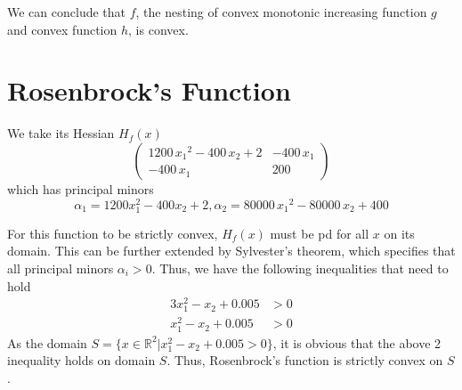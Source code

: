 We can conclude that $f$, the nesting of convex monotonic increasing function $g$ and convex function $h$, is convex.

\section{Rosenbrock's Function}
We take its Hessian $H_f(x)$
\[
\left(\begin{array}{cc}
1200\,{x_1 }^2 -400\,x_2 +2 & -400\,x_1 \\
-400\,x_1  & 200
\end{array}\right)
\]
which has principal minors
\[
\alpha_1 = 1200x_1^2-400x_2 + 2, \alpha_2 = 80000\,{x_1 }^2 -80000\,x_2 +400
\]

For this function to be strictly convex, $H_f(x)$ must be pd for all $x$ on its domain. This can be further extended by Sylvester's theorem, which specifies that all principal minors $\alpha_i > 0$. Thus, we have the following inequalities that need to hold
\begin{align*}
    3x_1^2-x_2+0.005 &> 0\\
    x_1^2 - x_2 + 0.005 &> 0
\end{align*}
As the domain $S = \{x \in \mathbb{R}^2 | x_1^2-x_2+0.005 > 0\}$, it is obvious that the above 2 inequality holds on domain $S$. Thus, Rosenbrock's function is strictly convex on $S$. 



